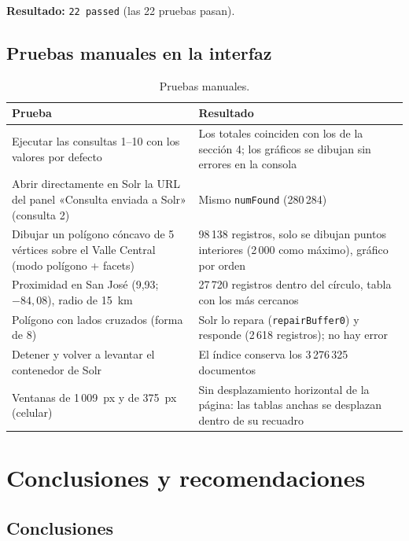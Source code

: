 \documentclass[11pt,a4paper]{article}
\newcommand{\cod}[1]{\texttt{#1}}
\begin{document}
\textbf{Resultado:} \cod{22 passed} (las 22 pruebas pasan).

\subsection{Pruebas manuales en la interfaz}

\begin{table}[H]
\centering\small
\begin{tabularx}{\textwidth}{@{}YY@{}}
\toprule
\textbf{Prueba} & \textbf{Resultado} \\
\midrule
Ejecutar las consultas 1--10 con los valores por defecto & Los totales coinciden con los de la sección 4; los gráficos se dibujan sin errores en la consola \\
Abrir directamente en Solr la URL del panel «Consulta enviada a Solr» (consulta 2) & Mismo \cod{numFound} (280\,284) \\
Dibujar un polígono cóncavo de 5 vértices sobre el Valle Central (modo polígono + facets) & 98\,138 registros, solo se dibujan puntos interiores (2\,000 como máximo), gráfico por orden \\
Proximidad en San José (9,93; $-84{,}08$), radio de 15~km & 27\,720 registros dentro del círculo, tabla con los más cercanos \\
Polígono con lados cruzados (forma de 8) & Solr lo repara (\cod{repairBuffer0}) y responde (2\,618 registros); no hay error \\
Detener y volver a levantar el contenedor de Solr & El índice conserva los 3\,276\,325 documentos \\
Ventanas de 1\,009~px y de 375~px (celular) & Sin desplazamiento horizontal de la página: las tablas anchas se desplazan dentro de su recuadro \\
\bottomrule
\end{tabularx}
\caption{Pruebas manuales.}
\end{table}

\section{Conclusiones y recomendaciones}

\subsection{Conclusiones}
\end{document}

